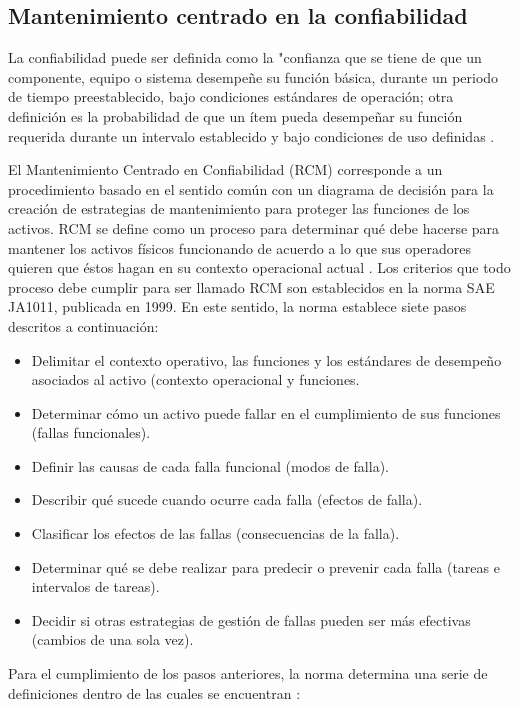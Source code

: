 \subsection{Mantenimiento centrado en la confiabilidad}

La confiabilidad puede ser definida como la "confianza que se tiene de que un componente, equipo o sistema desempeñe su función básica, durante un periodo de tiempo preestablecido, bajo condiciones estándares de operación; otra definición es la probabilidad de que un ítem pueda desempeñar su función requerida durante un intervalo establecido y bajo condiciones de uso definidas \citep{dairo2016}. 

El Mantenimiento Centrado en Confiabilidad (RCM) corresponde a un procedimiento basado en el sentido común con un diagrama de decisión para la creación de estrategias de mantenimiento para proteger las funciones de los activos. RCM se define como un proceso para determinar qué debe hacerse para mantener los activos físicos funcionando de acuerdo a lo que sus operadores quieren que éstos hagan en su contexto operacional actual \citep{sifonte2017}.
Los criterios que todo proceso debe cumplir para ser llamado RCM son establecidos en la norma SAE JA1011, publicada en 1999. En este sentido, la norma establece siete pasos descritos a continuación:\\

\begin{itemize}
\item Delimitar el contexto operativo, las funciones y los estándares de desempeño asociados al activo (contexto operacional y funciones.
\item Determinar cómo un activo puede fallar en el cumplimiento de sus funciones (fallas funcionales).
\item Definir las causas de cada falla funcional (modos de falla).
\item Describir qué sucede cuando ocurre cada falla (efectos de falla).
\item Clasificar los efectos de las fallas (consecuencias de la falla).
\item Determinar qué se debe realizar para predecir o prevenir cada falla (tareas e intervalos de tareas).
\item Decidir si otras estrategias de gestión de fallas pueden ser más efectivas (cambios de una sola vez). 
\end{itemize}

Para el cumplimiento de los pasos anteriores, la norma determina una serie de definiciones dentro de las cuales se encuentran \citep{saeja1011}:\\

